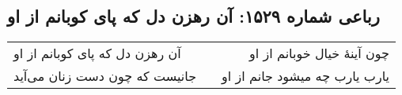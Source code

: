 \begin{center}
\section*{رباعی شماره ۱۵۲۹: آن رهزن دل که پای کوبانم از او}
\label{sec:1529}
\begin{longtable}{l p{0.5cm} r}
آن رهزن دل که پای کوبانم از او
&&
چون آینهٔ خیال خوبانم از او
\\
جانیست که چون دست زنان می‌آید
&&
یارب یارب چه میشود جانم از او
\\
\end{longtable}
\end{center}
